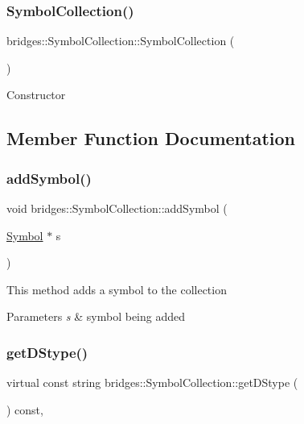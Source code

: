 \subsubsection{\texorpdfstring{Symbol\+Collection()}{SymbolCollection()}}
{\footnotesize\ttfamily bridges\+::\+Symbol\+Collection\+::\+Symbol\+Collection (\begin{DoxyParamCaption}{ }\end{DoxyParamCaption})\hspace{0.3cm}{\ttfamily [inline]}}

Constructor 

\subsection{Member Function Documentation}
\mbox{\label{classbridges_1_1_symbol_collection_acdc101f6651becc430e281ed967ddedf}} 
\subsubsection{\texorpdfstring{add\+Symbol()}{addSymbol()}}
{\footnotesize\ttfamily void bridges\+::\+Symbol\+Collection\+::add\+Symbol (\begin{DoxyParamCaption}\item[{\mbox{\hyperlink{classbridges_1_1_symbol}{Symbol}} $\ast$}]{s }\end{DoxyParamCaption})\hspace{0.3cm}{\ttfamily [inline]}}

This method adds a symbol to the collection


\begin{DoxyParams}{Parameters}
{\em s} & symbol being added \\
\hline
\end{DoxyParams}
\mbox{\label{classbridges_1_1_symbol_collection_a9bc5abacaf6f90b2d013963311c8052e}} 
\subsubsection{\texorpdfstring{get\+D\+Stype()}{getDStype()}}
{\footnotesize\ttfamily virtual const string bridges\+::\+Symbol\+Collection\+::get\+D\+Stype (\begin{DoxyParamCaption}{ }\end{DoxyParamCaption}) const\hspace{0.3cm}{\ttfamily [inline]}, {\ttfamily [virtual]}}

